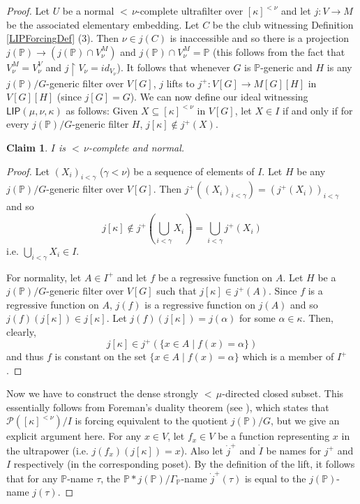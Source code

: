 \documentclass[a4paper]{amsart}
\theoremstyle{definition}
\theoremstyle{remark}
\theoremstyle{plain}
\newtheorem{myclaim}{Claim}
\numberwithin{mydef}{section}
\newcommand{\dP}{\mathbb{P}}
\newcommand{\LIP}{\mathsf{LIP}}
\begin{document}
	\begin{proof}
		Let $U$ be a normal ${<}\,\nu$-complete ultrafilter over $[\kappa]^{<\nu}$ and let $j\colon V\to M$ be the associated elementary embedding. Let $C$ be the club witnessing Definition \ref{LIPForcingDef} (3). Then $\nu\in j(C)$ is inaccessible and so there is a projection $j(\dP)\to(j(\dP)\cap V_{\nu}^M)$ and $j(\dP)\cap V_{\nu}^M=\dP$ (this follows from the fact that $V_{\nu}^M=V_{\nu}^V$ and $j\upharpoonright V_{\nu}=id_{V_{\nu}}$). It follows that whenever $G$ is $\dP$-generic and $H$ is any $j(\dP)/G$-generic filter over $V[G]$, $j$ lifts to $j^+\colon V[G]\to M[G][H]$ in $V[G][H]$ (since $j[G]=G$). We can now define our ideal witnessing $\LIP(\mu,\nu,\kappa)$ as follows: Given $X\subseteq[\kappa]^{<\nu}$ in $V[G]$, let $X\in I$ if and only if for every $j(\dP)/G$-generic filter $H$, $j[\kappa]\notin j^+(X)$.
		
		\begin{myclaim}
			$I$ is ${<}\,\nu$-complete and normal.
		\end{myclaim}
		
		\begin{proof}
			Let $(X_i)_{i<\gamma}$ ($\gamma<\nu$) be a sequence of elements of $I$. Let $H$ be any $j(\dP)/G$-generic filter over $V[G]$. Then $j^+((X_i)_{i<\gamma})=(j^+(X_i))_{i<\gamma}$ and so
			$$j[\kappa]\notin j^+\left(\bigcup_{i<\gamma}X_i\right)=\bigcup_{i<\gamma}j^+(X_i)$$
			i.e. $\bigcup_{i<\gamma}X_i\in I$.
			
			For normality, let $A\in I^+$ and let $f$ be a regressive function on $A$. Let $H$ be a $j(\dP)/G$-generic filter over $V[G]$ such that $j[\kappa]\in j^+(A)$. Since $f$ is a regressive function on $A$, $j(f)$ is a regressive function on $j(A)$ and so $j(f)(j[\kappa])\in j[\kappa]$. Let $j(f)(j[\kappa])=j(\alpha)$ for some $\alpha\in\kappa$. Then, clearly,
			$$j[\kappa]\in j^+\left(\{x\in A\;|\;f(x)=\alpha\}\right)$$
			and thus $f$ is constant on the set $\{x\in A\;|\;f(x)=\alpha\}$ which is a member of $I^+$.
		\end{proof}
		
		Now we have to construct the dense strongly ${<}\,\mu$-directed closed subset. This essentially follows from Foreman's duality theorem (see \cite[Theorem 7.14]{ForemanChapter}), which states that $\mathcal{P}([\kappa]^{<\nu})/I$ is forcing equivalent to the quotient $j(\dP)/G$, but we give an explicit argument here. For any $x\in V$, let $f_x\in V$ be a function representing $x$ in the ultrapower (i.e. $j(f_x)(j[\kappa])=x$). Also let $\dot{j}^+$ and $\dot{I}$ be names for $j^+$ and $I$ respectively (in the corresponding poset). By the definition of the lift, it follows that for any $\dP$-name $\tau$, the $\dP*j(\dP)/\Gamma_{\dP}$-name $\dot{j}^+(\tau)$ is equal to the $j(\dP)$-name $j(\tau)$.
		

\end{proof}
\end{document}
